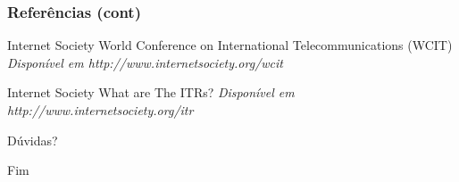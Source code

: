 \documentclass{beamer}
\begin{document}

\begin{frame}
\frametitle{Referências (cont)}
\footnotesize{
\begin{thebibliography}{99} %

 Internet Society
\newblock World Conference on International Telecommunications (WCIT)
\newblock \emph{Disponível em http://www.internetsociety.org/wcit}

 Internet Society
\newblock What are The ITRs?
\newblock \emph{Disponível em http://www.internetsociety.org/itr}

\end{thebibliography}
}
\end{frame}


\begin{frame}
\Huge{\centerline{Dúvidas?}}
\end{frame}


\begin{frame}
\Huge{\centerline{Fim}}
\end{frame}

\end{document}
